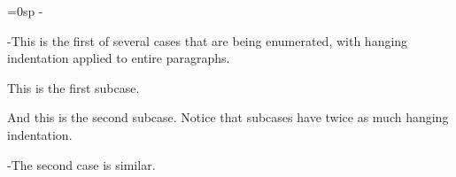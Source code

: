 
=0sp
\advance{} -\textindent
\show \hang
\def\bitem{\par\hang \hangindent-\parindent \textindent}
\def\bitemitem{\par\indent \hangindent2\parindent \hangindent-2\parindent \textindent}

\bitem{$\bullet$}This is the first of several cases that are being enumerated, with hanging
indentation applied to entire paragraphs.
\bitemitem{$\bullet$}This is the first subcase.
\bitemitem{$\bullet$}And this is the second subcase. Notice that subcases have twice as
much hanging indentation.
\bitem{$\bullet$}The second case is similar.

\bye

